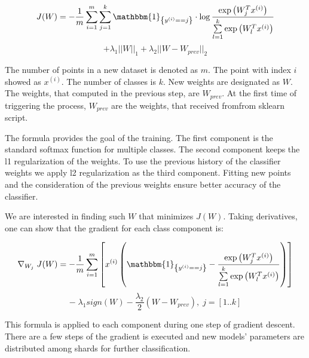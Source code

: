 \begin{center}

$$ J(W) = -\frac{1}{m} \sum \limits_{i = 1}^{m} \sum \limits_{j = 1}^{k} \mathbbm{1}_{\left\{y^{(i)} == j\right\}} \cdot \log \frac{\exp\left({W_{j}^Tx^{(i)}}\right) }{\sum \limits_{l = 1}^{k}  \exp\left({W_{l}^Tx^{(i)}}\right) }$$ 
 $$ +  \lambda_1 ||W||_1 + \lambda_2 ||W - W_{prev}||_2 $$

\end{center} 

The number of points in a new dataset is denoted as $m$. The point with index $i$ showed as $x^{(i)}$. The number of classes is $k$. New weights are designated as $W$. The weights, that computed in the previous step, are $W_{prev}$. At the first time of triggering the process, $W_{prev}$ are the weights, that received fromfrom sklearn script. 

The formula provides the goal of the training. The first component is the standard softmax function for multiple classes. The second component keeps the l1 regularization of the weights. To use the previous history of the classifier weights we apply l2 regularization as the third component. Fitting new points and the consideration of the previous weights ensure better accuracy of the classifier.

We are interested in finding such $W$ that minimizes $J(W)$. Taking derivatives, one can show that the gradient for each class component is:

\begin{center}

$$ \nabla_{W_j} \; J(W) = -\frac{1}{m} \sum \limits_{i = 1}^{m} \left[ x^{(i)} \left( \mathbbm{1}_{\left\{y^{(i)} == j\right\} } - \frac{\exp\left({W_{j}^Tx^{(i)}}\right)}{\sum \limits_{l = 1}^{k}  \exp\left({W_{l}^Tx^{(i)}}\right)} \right) \right] $$
$$ - \; \lambda_1 sign\left(W\right) - \frac{\lambda_2}{2} \left(W - W_{prev} \right), \; j = [1..k] $$

\end{center} 

This formula is applied to each component during one step of gradient descent. There are a few steps of the gradient is executed and new models' parameters are distributed among shards for further classification.